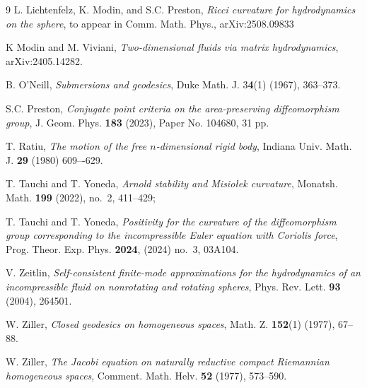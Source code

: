 \documentclass[oneside, 11pt]{amsart}
\numberwithin{equation}{section}
\begin{document}
\begin{thebibliography}{9}
L. Lichtenfelz, K. Modin, and S.C. Preston, \emph{Ricci curvature for hydrodynamics on the sphere}, to appear in Comm. Math. Phys., 	arXiv:2508.09833

K Modin and M. Viviani, \emph{Two-dimensional fluids via matrix hydrodynamics}, arXiv:2405.14282.

B. O’Neill, \emph{Submersions and geodesics}, Duke Math. J. 3\textbf{4}(1) (1967), 363--373.

S.C. Preston, \emph{Conjugate point criteria on the area-preserving diffeomorphism group},
J. Geom. Phys. \textbf{183} (2023), Paper No. 104680, 31 pp.

T. Ratiu, \emph{The motion of the free $n$-dimensional rigid body}, Indiana Univ. Math. J. \textbf{29} (1980) 609–-629.

T. Tauchi and T. Yoneda, \emph{Arnold stability and Misio\l ek curvature}, Monatsh. Math. {\bf 199} (2022), no.~2, 411--429; 

T. Tauchi and T. Yoneda, \emph{Positivity for the curvature of the diffeomorphism group corresponding to the incompressible Euler equation with Coriolis force}, 	Prog. Theor. Exp. Phys. {\bf 2024}, (2024) no.~3, 03A104.

V. Zeitlin, \emph{Self-consistent finite-mode approximations for the hydrodynamics of an incompressible fluid on nonrotating and rotating spheres}, Phys. Rev. Lett. \textbf{93} (2004), 264501.

W. Ziller, \emph{Closed geodesics on homogeneous spaces}, Math. Z. \textbf{152}(1) (1977), 67--88.

W. Ziller, \emph{The Jacobi equation on naturally reductive compact Riemannian homogeneous spaces}, 
Comment. Math. Helv. \textbf{52} (1977), 573--590.



\end{thebibliography}
\end{document}
